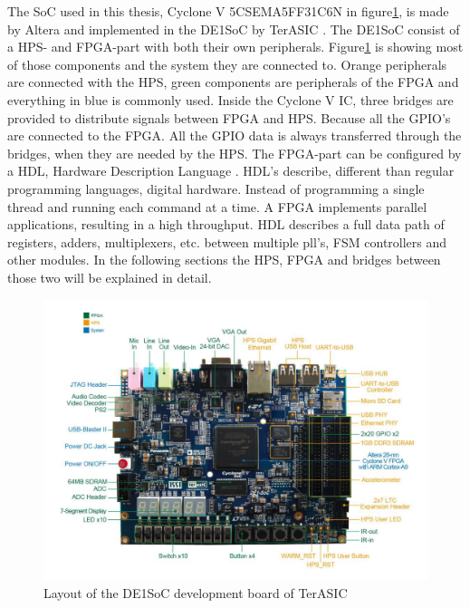 \documentclass[12pt,a4paper,english,twoside,openright]{tutthesis}
\begin{document}
The SoC used in this thesis, Cyclone V 5CSEMA5FF31C6N \cite{CycloneV} in figure\ref{fig:DE1SoClay}, is made by Altera and implemented in the DE1SoC by TerASIC \cite{DE1SoC}. The DE1SoC consist of a HPS- and FPGA-part with both their own peripherals. Figure\ref{fig:DE1SoClay} is showing most of those components and the system they are connected to. Orange peripherals are connected with the HPS, green components are peripherals of the FPGA and everything in blue is commonly used. Inside the Cyclone V IC, three bridges are provided to distribute signals between FPGA and HPS. Because all the GPIO's are connected to the FPGA. All the GPIO data is always transferred through the bridges, when they are needed by the HPS. The FPGA-part can be configured by a HDL, Hardware Description Language \cite{CMOSVLSIDesign}. HDL's describe, different than regular programming languages, digital hardware. Instead of programming a single thread and running each command at a time. A FPGA implements parallel applications, resulting in a high throughput. HDL describes a full data path of registers, adders, multiplexers, etc. between multiple pll's, FSM controllers and other modules. In the following sections the HPS, FPGA and bridges between those two will be explained in detail.
\begin{figure}
	\centering
	\includegraphics[scale=0.4]{images/DE1SoCLayout.png}
	\caption{Layout of the DE1SoC development board of TerASIC}
	\label{fig:DE1SoClay}
\end{figure}
\end{document}
